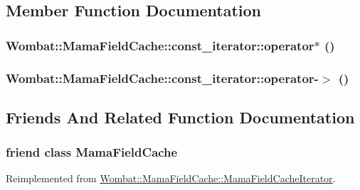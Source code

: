 \subsection{Member Function Documentation}
\hypertarget{classWombat_1_1MamaFieldCache_1_1const__iterator_ad6b81b820a533de68fec3accce6df476}{
\subsubsection[{operator$\ast$}]{ Wombat::MamaFieldCache::const\_\-iterator::operator$\ast$ ()}}
\label{classWombat_1_1MamaFieldCache_1_1const__iterator_ad6b81b820a533de68fec3accce6df476}
\hypertarget{classWombat_1_1MamaFieldCache_1_1const__iterator_af557d4888d3e7c3dc3220979a0c3af41}{
\subsubsection[{operator-\/$>$}]{ Wombat::MamaFieldCache::const\_\-iterator::operator-\/$>$ ()}}
\label{classWombat_1_1MamaFieldCache_1_1const__iterator_af557d4888d3e7c3dc3220979a0c3af41}


\subsection{Friends And Related Function Documentation}
\hypertarget{classWombat_1_1MamaFieldCache_1_1const__iterator_a6a1b5aceea64638fc294b40bdb9251fb}{
\subsubsection[{MamaFieldCache}]{\setlength{\rightskip}{0pt plus 5cm}friend class {\bf MamaFieldCache}}}
\label{classWombat_1_1MamaFieldCache_1_1const__iterator_a6a1b5aceea64638fc294b40bdb9251fb}


Reimplemented from \hyperlink{classWombat_1_1MamaFieldCache_1_1MamaFieldCacheIterator_a6a1b5aceea64638fc294b40bdb9251fb}{Wombat::MamaFieldCache::MamaFieldCacheIterator}.